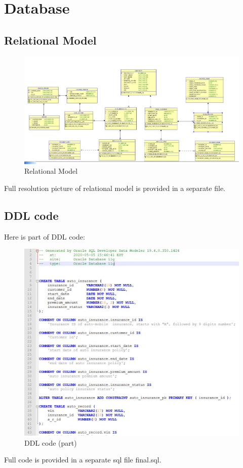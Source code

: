 \documentclass[12pt]{article}
\begin{document}
		\newpage
	
	\section{Database}
	\subsection{Relational Model}
	\begin{figure}[H]
		\centering
		\includegraphics[scale=0.45]{rel}
		\caption{Relational Model}
	\end{figure}
	Full resolution picture of relational model is provided in a separate file.
	\newpage
		
	\subsection{DDL code}
	Here is part of DDL code:\\
	\begin{figure}[H]
		\centering
		\includegraphics[scale=0.55]{ddl}
		\caption{DDL code (part)}
	\end{figure}
	Full code is provided in a separate sql file final.sql.\\
	
\end{document}
